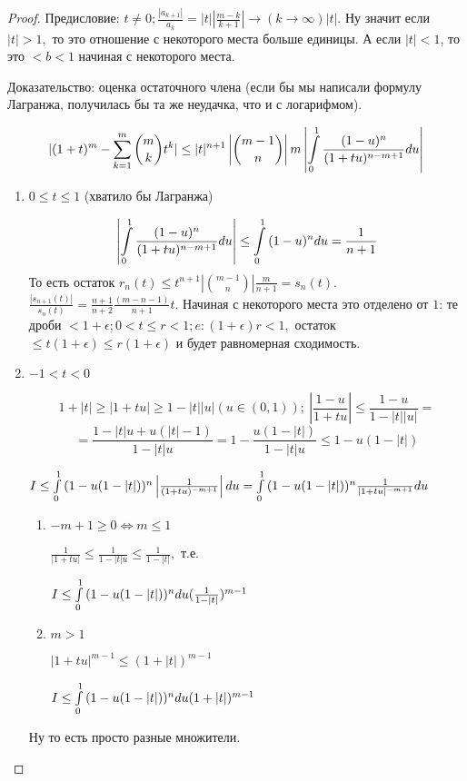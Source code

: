 \documentclass[12pt]{report}
\begin{document}
\begin{proof}
Предисловие:
$t \neq 0; \frac{|a_{k + 1}|}{a_k} = |t|\left|\frac{m - k}{k + 1}\right| \to (k \to \infty) |t|$. Ну значит если $|t| > 1,$ то это отношение с некоторого места больше единицы. А если $|t| < 1$, то это $< b < 1$ начиная с некоторого места.

Доказательство: оценка остаточного члена (если бы мы написали формулу Лагранжа, получилась бы та же неудачка, что и с логарифмом).

$$|(1 + t)^m - \sum\limits_{k = 1}^m{\binom{m}{k}t^k}| \le |t|^{n + 1}\left|\binom{m - 1}{n}\right|m\left|\int\limits_0^1{\frac{(1 - u)^n}{(1 + tu)^{n - m + 1}}du}\right|$$

\begin{enumerate}
\item $0 \le t \le 1$ (хватило бы Лагранжа)

$$\left|\int\limits_0^1{\frac{(1 - u)^n}{(1 + tu)^{n - m + 1}}du}\right| \le \int\limits_0^1{(1 - u)^ndu} = \frac{1}{n + 1}$$
То есть остаток $r_n(t) \le t^{n + 1}\left|\binom{m - 1}{n}\right|\frac{m}{n + 1} = s_n(t)$. $\frac{|s_{n + 1}(t)|}{s_n(t)} = \frac{n + 1}{n + 2}\frac{(m - n - 1)}{n + 1}t$. Начиная с некоторого места это отделено от $1$: те дроби $< 1 + \epsilon; 0 < t \le r < 1; e: (1 + \epsilon)r < 1,$ остаток $\le t(1 + \epsilon) \le r(1 + \epsilon)$ и будет равномерная сходимость.

\item $-1 < t < 0$

$$1 + |t| \ge |1 + tu| \ge 1 - |t||u| (u \in (0, 1)); ~\left|\frac{1 - u}{1 + tu}\right| \le \frac{1 - u}{1 - |t||u|} = $$ $$ = \frac{1 - |t|u + u(|t| - 1)}{1 - |t|u} = 1 - \frac{u(1 - |t|)}{1 - |t|u} \le 1 - u(1 - |t|)$$

$I \le \int\limits_0^1{(1 - u(1 - |t|))^n \left|\frac{1}{(1 + tu)^{-m + 1}}\right|du} = \int\limits_0^1{(1 - u(1 - |t|))^n\frac{1}{|1 + tu|^{-m + 1}}du}$
\begin{enumerate}
\item $- m + 1 \ge 0 \Leftrightarrow m \le 1$

$\frac{1}{|1 + tu|} \le \frac{1}{1 - |t|u} \le \frac{1}{1 - |t|},$ т.е. 

$I \le \int\limits_0^1{(1 - u(1 - |t|))^ndu(\frac{1}{1 - |t|})^{m - 1}}$

\item $m > 1$

$|1 + tu|^{m - 1} \le (1 + |t|)^{m - 1}$

$I \le \int\limits_0^1{(1 - u(1 - |t|))^ndu(1 + |t|)^{m - 1}}$
\end{enumerate}
Ну то есть просто разные множители.


\end{enumerate}
\end{proof}
\end{document}
